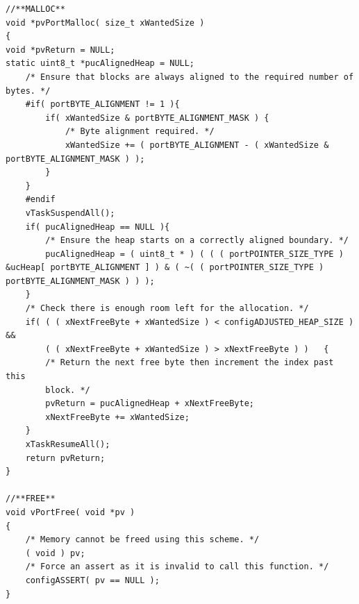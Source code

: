 \begin{lstlisting}[caption={Implementierung von malloc() und free() in Heap1}, linewidth=8cm,captionpos=b, label=lst:heap1, float=hbt]
//**MALLOC**
void *pvPortMalloc( size_t xWantedSize )
{
void *pvReturn = NULL;
static uint8_t *pucAlignedHeap = NULL;
	/* Ensure that blocks are always aligned to the required number of bytes. */
	#if( portBYTE_ALIGNMENT != 1 ){
		if( xWantedSize & portBYTE_ALIGNMENT_MASK )	{
			/* Byte alignment required. */
			xWantedSize += ( portBYTE_ALIGNMENT - ( xWantedSize & portBYTE_ALIGNMENT_MASK ) );
		}
	}
	#endif
	vTaskSuspendAll();
	if( pucAlignedHeap == NULL ){
		/* Ensure the heap starts on a correctly aligned boundary. */
		pucAlignedHeap = ( uint8_t * ) ( ( ( portPOINTER_SIZE_TYPE ) &ucHeap[ portBYTE_ALIGNMENT ] ) & ( ~( ( portPOINTER_SIZE_TYPE ) portBYTE_ALIGNMENT_MASK ) ) );
	}
	/* Check there is enough room left for the allocation. */
	if( ( ( xNextFreeByte + xWantedSize ) < configADJUSTED_HEAP_SIZE ) &&
		( ( xNextFreeByte + xWantedSize ) > xNextFreeByte )	)	{
		/* Return the next free byte then increment the index past this
		block. */
		pvReturn = pucAlignedHeap + xNextFreeByte;
		xNextFreeByte += xWantedSize;
	}
	xTaskResumeAll();
	return pvReturn;
}

//**FREE**
void vPortFree( void *pv )
{
	/* Memory cannot be freed using this scheme. */
	( void ) pv;
	/* Force an assert as it is invalid to call this function. */
	configASSERT( pv == NULL );
}

\end{lstlisting}

